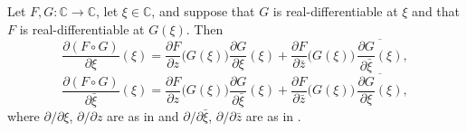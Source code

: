 \begin{lemma}
Let $F,G\colon\mathbb{C}\to\mathbb{C}$, let $\xi\in\mathbb{C}$, and suppose
that $G$ is real-differentiable at $\xi$ and that $F$ is real-differentiable at
$G(\xi)$.  Then
\[
  \frac{\partial(F\circ G)}{\partial\xi}(\xi)
  =\frac{\partial F}{\partial z}\bigl(G(\xi)\bigr)\frac{\partial G}{\partial\xi}(\xi)
   +\frac{\partial F}{\partial\bar z}\bigl(G(\xi)\bigr)\,
    \overline{\frac{\partial G}{\partial\bar\xi}(\xi)},
\]
\[
  \frac{\partial(F\circ G)}{\partial\bar\xi}(\xi)
  =\frac{\partial F}{\partial z}\bigl(G(\xi)\bigr)\frac{\partial G}{\partial\bar\xi}(\xi)
   +\frac{\partial F}{\partial\bar z}\bigl(G(\xi)\bigr)\,
    \overline{\frac{\partial G}{\partial\xi}(\xi)},
\]
where $\partial/\partial\xi$, $\partial/\partial z$ are as in  and
$\partial/\partial\bar\xi$, $\partial/\partial\bar z$ are as in
.
\end{lemma}
